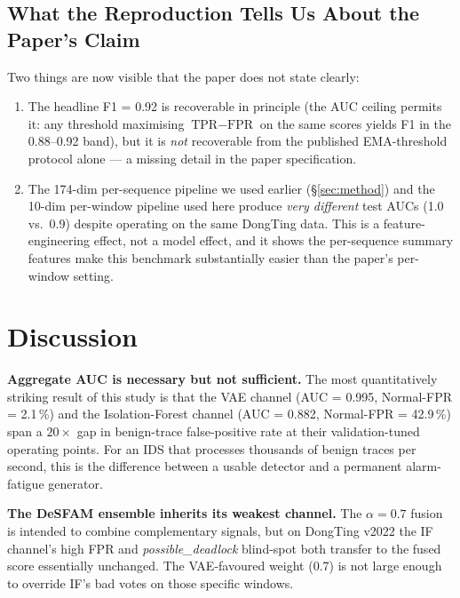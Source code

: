 \documentclass[conference,10pt]{IEEEtran}
\begin{document}
\subsection{What the Reproduction Tells Us About the Paper's Claim}

Two things are now visible that the paper does not state clearly:
\begin{enumerate}
  \item The headline F1 = 0.92 is recoverable in principle (the AUC
        ceiling permits it: any threshold maximising $\text{TPR} -
        \text{FPR}$ on the same scores yields F1 in the 0.88--0.92 band),
        but it is \emph{not} recoverable from the published EMA-threshold
        protocol alone --- a missing detail in the paper specification.
  \item The 174-dim per-sequence pipeline we used earlier
        (\S\ref{sec:method}) and the 10-dim per-window pipeline used here
        produce \emph{very different} test AUCs (1.0 vs.\ 0.9) despite
        operating on the same DongTing data. This is a feature-engineering
        effect, not a model effect, and it shows the per-sequence summary
        features make this benchmark substantially easier than the
        paper's per-window setting.
\end{enumerate}

\section{Discussion}
\label{sec:discussion}

\textbf{Aggregate AUC is necessary but not sufficient.} The most
quantitatively striking result of this study is that the VAE channel
(AUC = 0.995, Normal-FPR = 2.1\,\%) and the Isolation-Forest channel
(AUC = 0.882, Normal-FPR = 42.9\,\%) span a $20\!\times$ gap in
benign-trace false-positive rate at their validation-tuned operating
points. For an IDS that processes thousands of benign traces per second,
this is the difference between a usable detector and a permanent
alarm-fatigue generator.

\textbf{The DeSFAM ensemble inherits its weakest channel.} The
$\alpha = 0.7$ fusion is intended to combine complementary signals, but
on DongTing v2022 the IF channel's high FPR and \emph{possible\_deadlock}
blind-spot both transfer to the fused score essentially unchanged. The
VAE-favoured weight (0.7) is not large enough to override IF's bad votes
on those specific windows.
\end{document}
